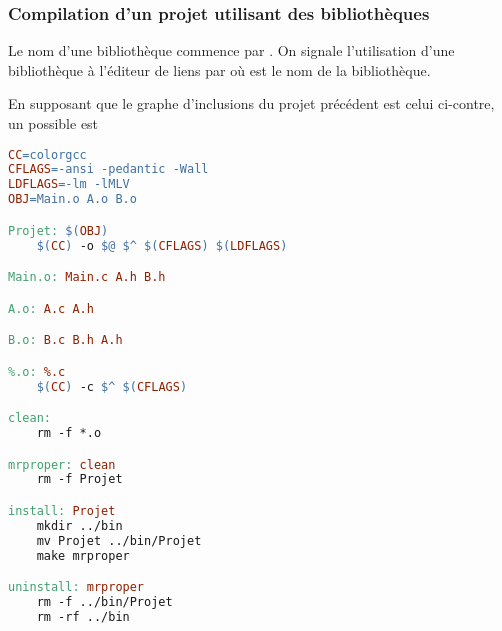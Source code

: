 \begin{frame}[fragile]
\frametitle{Compilation d'un projet utilisant des bibliothèques}
Le nom d'une bibliothèque commence par . On signale l'utilisation
d'une bibliothèque à l'éditeur de liens par  où 
est le nom de la bibliothèque.

\begin{multicols}{2}
\footnotesize
En supposant que le graphe d'inclusions du projet précédent est celui
ci-contre, un  possible est
\begin{center}
\end{center}
\end{multicols}
\begin{multicols}{2}
\begin{lstlisting}[language=make,basicstyle=\scriptsize\tt]
CC=colorgcc
CFLAGS=-ansi -pedantic -Wall
LDFLAGS=-lm -lMLV
OBJ=Main.o A.o B.o

Projet: $(OBJ)
    $(CC) -o $@ $^ $(CFLAGS) $(LDFLAGS)

Main.o: Main.c A.h B.h

A.o: A.c A.h

B.o: B.c B.h A.h

%.o: %.c
    $(CC) -c $^ $(CFLAGS)

clean:
    rm -f *.o

mrproper: clean
    rm -f Projet

install: Projet
    mkdir ../bin
    mv Projet ../bin/Projet
    make mrproper

uninstall: mrproper
    rm -f ../bin/Projet
    rm -rf ../bin
\end{lstlisting}
\begin{math}\end{math}
\end{multicols}
\end{frame}

